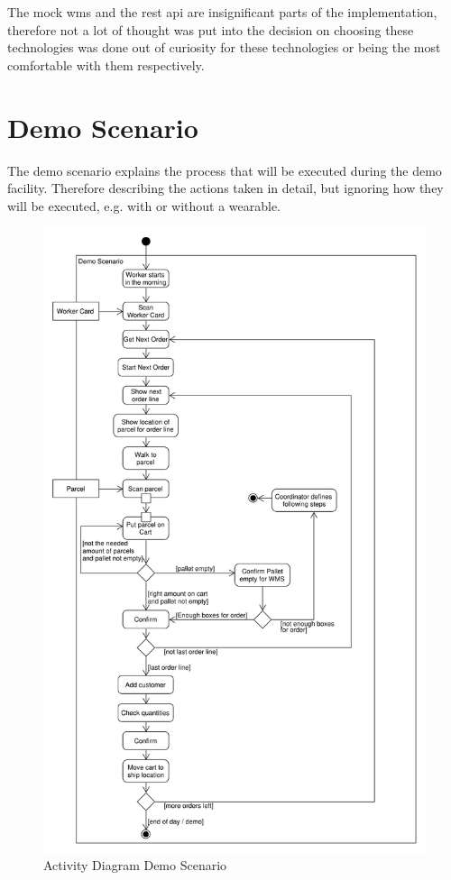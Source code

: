 The mock \gls{wms} and the \gls{rest} \gls{api} are insignificant parts of the implementation, therefore not a lot of thought was put into the decision on choosing these technologies was done out of curiosity for these technologies or being the most comfortable with them respectively.

\section{Demo Scenario}
The demo scenario explains the process that will be executed during the demo facility. Therefore describing the actions taken in detail, but ignoring how they will be executed, e.g. with or without a wearable. 

\begin{figure}[htbp]
	\includegraphics[height=\textheight]{images/activityDiagram_demoScenarioNoExceptions}
	\caption{Activity Diagram Demo Scenario}
	\label{fig:activityDemoScenario}
\end{figure}



